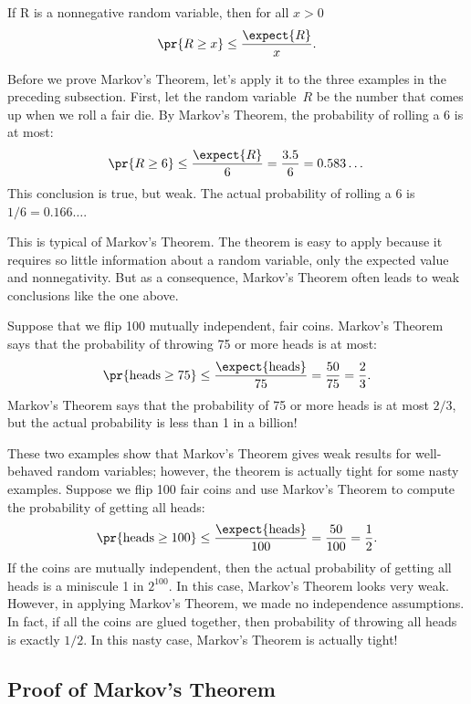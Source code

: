 \begin{theorem}\label{markovthm}
  If R is a nonnegative random variable, then for all $x > 0$
  \begin{displaymath}
    \pr{R \geq x} \leq \frac{\expect{R}}{x}.
  \end{displaymath}
\end{theorem}

\begin{editingnotes}

Before we prove Markov's Theorem, let's apply it to the three examples in
the preceding subsection.  First, let the random variable~$R$ be the
number that comes up when we roll a fair die.  By Markov's Theorem, the
probability of rolling a 6 is at most:
\[
\pr{R \geq 6} \leq \frac{\expect{R}}{6} = \frac{3.5}{6} = 0.583\dots
\]
This conclusion is true, but weak.  The actual probability of rolling
a 6 is $1/6 = 0.166\dots$.

This is typical of Markov's Theorem.  The theorem is easy to apply
because it requires so little information about a random variable,
only the expected value and nonnegativity.  But as a consequence,
Markov's Theorem often leads to weak conclusions like the one above.

Suppose that we flip 100 mutually independent, fair coins.  Markov's
Theorem says that the probability of throwing 75 or more heads is at
most:
\[
\pr{\text{heads} \geq 75} \leq \frac{\expect{\text{heads}}}{75} =
\frac{50}{75} = \frac{2}{3}.
\]
Markov's Theorem says that the probability of 75 or more heads is at
most $2/3$, but the actual probability is less than 1 in a
billion!

These two examples show that Markov's Theorem gives weak results for
well-behaved random variables; however, the theorem is actually tight
for some nasty examples.  Suppose we flip 100 fair coins and use
Markov's Theorem to compute the probability of getting all heads:
\[
\pr{\text{heads} \geq 100} \leq \frac{\expect{\text{heads}}}{100} =
\frac{50}{100} = \frac{1}{2}.
\]
If the coins are mutually independent, then the actual probability of
getting all heads is a miniscule 1 in $2^{100}$.  In this case, Markov's
Theorem looks very weak.  However, in applying Markov's Theorem, we made
no independence assumptions.  In fact, if all the coins are glued
together, then probability of throwing all heads is exactly $1/2$.
In this nasty case, Markov's Theorem is actually tight!

\subsection{Proof of Markov's Theorem}


\end{editingnotes}
